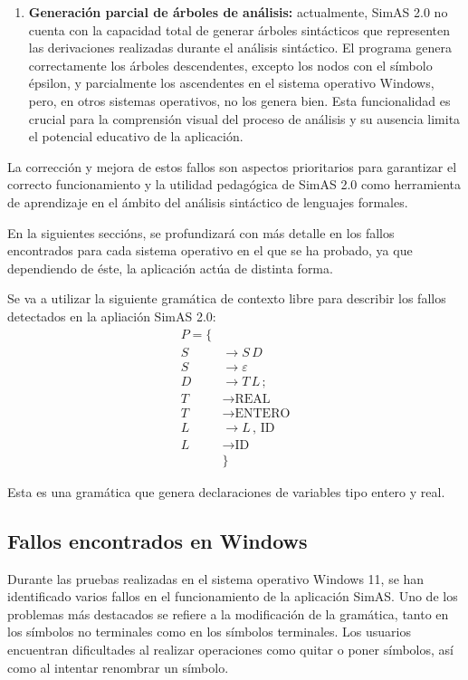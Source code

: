 \begin{enumerate}
    \item \textbf{Generación parcial de árboles de análisis:} actualmente, SimAS 2.0 no cuenta con la capacidad total de generar árboles sintácticos que representen las derivaciones realizadas durante el análisis sintáctico. El programa genera correctamente los árboles descendentes, excepto los nodos con el símbolo épsilon, y parcialmente los ascendentes en el sistema operativo Windows, pero, en otros sistemas operativos, no los genera bien. Esta funcionalidad es crucial para la comprensión visual del proceso de análisis y su ausencia limita el potencial educativo de la aplicación.
\end{enumerate}

La corrección y mejora de estos fallos son aspectos prioritarios para garantizar el correcto funcionamiento y la utilidad pedagógica de SimAS 2.0 como herramienta de aprendizaje en el ámbito del análisis sintáctico de lenguajes formales.

En la siguientes seccións, se profundizará con más detalle en los fallos encontrados para cada sistema operativo en el que se ha probado, ya que dependiendo de éste, la aplicación actúa de distinta forma.

Se va a utilizar la siguiente gramática de contexto libre para describir los fallos detectados en la apliación SimAS 2.0:
\begin{align*}
P = \{ & \\ 
S &\rightarrow S \, D \\
S &\rightarrow \varepsilon \\
D &\rightarrow T \, L \, ; \\
T &\rightarrow \text{REAL} \\
T &\rightarrow \text{ENTERO} \\
L &\rightarrow L \, , \, \text{ID} \\
L &\rightarrow \text{ID} \\
  & \}
\end{align*}

Esta es una gramática que genera declaraciones de variables tipo entero y real.

\subsection{Fallos encontrados en Windows}
Durante las pruebas realizadas en el sistema operativo Windows 11, se han identificado varios fallos en el funcionamiento de la aplicación SimAS. Uno de los problemas más destacados se refiere a la modificación de la gramática, tanto en los símbolos no terminales como en los símbolos terminales. Los usuarios encuentran dificultades al realizar operaciones como quitar o poner símbolos, así como al intentar renombrar un símbolo.

